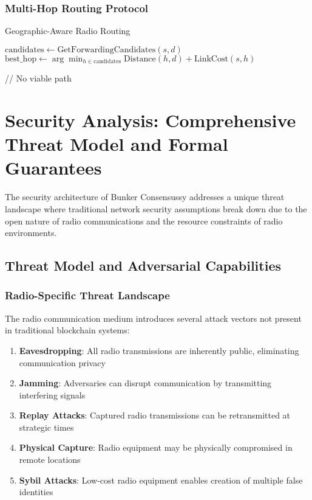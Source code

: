 \documentclass[11pt,a4paper]{article}
\begin{document}
\subsubsection{Multi-Hop Routing Protocol}

\begin{algorithm}[H]
\SetAlgoLined
{}
\caption{Geographic-Aware Radio Routing}



$\text{candidates} \leftarrow \text{GetForwardingCandidates}(s, d)$\;
$\text{best\_hop} \leftarrow \arg\min_{h \in \text{candidates}} \text{Distance}(h, d) + \text{LinkCost}(s, h)$\;


\; // No viable path
\end{algorithm}

\section{Security Analysis: Comprehensive Threat Model and Formal Guarantees}

The security architecture of Bunker Consensussy addresses a unique threat landscape where traditional network security assumptions break down due to the open nature of radio communications and the resource constraints of radio environments.

\subsection{Threat Model and Adversarial Capabilities}

\subsubsection{Radio-Specific Threat Landscape}

The radio communication medium introduces several attack vectors not present in traditional blockchain systems:

\begin{enumerate}
\item \textbf{Eavesdropping}: All radio transmissions are inherently public, eliminating communication privacy
\item \textbf{Jamming}: Adversaries can disrupt communication by transmitting interfering signals
\item \textbf{Replay Attacks}: Captured radio transmissions can be retransmitted at strategic times
\item \textbf{Physical Capture}: Radio equipment may be physically compromised in remote locations
\item \textbf{Sybil Attacks}: Low-cost radio equipment enables creation of multiple false identities
\end{enumerate}
\end{document}
